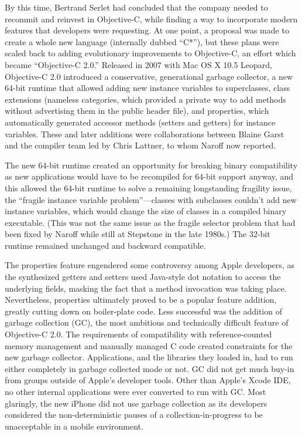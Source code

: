 \documentclass[acmsmall]{acmart}\settopmatter{}
\begin{document}
By this time, Bertrand Serlet had concluded that the company needed to recommit and reinvest in Objective-C, while finding a way to incorporate modern features that developers were requesting. At one point, a proposal was made to create a whole new language (internally dubbed ``C*''), but these plans were scaled back to adding evolutionary improvements to Objective-C, an effort which became ``Objective-C 2.0.'' Released in 2007 with Mac OS X 10.5 Leopard, Objective-C 2.0 introduced a conservative, generational garbage collector, a new 64-bit runtime that allowed adding new instance variables to superclasses, class extensions (nameless categories, which provided a private way to add methods without advertising them in the public header file), and properties, which automatically generated accessor methods (setters and getters) for instance variables. These and later additions were collaborations between Blaine Garst and the compiler team led by Chris Lattner, to whom Naroff now reported.

The new 64-bit runtime created an opportunity for breaking binary compatibility as new applications would have to be recompiled for 64-bit support anyway, and this allowed the 64-bit runtime to solve a remaining longstanding fragility issue, the ``fragile instance variable problem''---classes with subclasses couldn't add new instance variables, which would change the size of classes in a compiled binary executable. (This was not the same issue as the fragile selector problem that had been fixed by Naroff while still at Stepstone in the late 1980s.) The 32-bit runtime remained unchanged and backward compatible.

The properties feature engendered some controversy among Apple developers, as the synthesized getters and setters used Java-style dot notation to access the underlying fields, masking the fact that a method invocation was taking place. Nevertheless, properties ultimately proved to be a popular feature addition, greatly cutting down on boiler-plate code. Less successful was the addition of garbage collection (GC), the most ambitious and technically difficult feature of Objective-C 2.0. The requirements of compatibility with reference-counted memory management and manually managed C code created constraints for the new garbage collector. Applications, and the libraries they loaded in, had to run either completely in garbage collected mode or not. GC did not get much buy-in from groups outside of Apple's developer tools. Other than Apple's Xcode IDE, no other internal applications were ever converted to run with GC. Most glaringly, the new iPhone did not use garbage collection as its developers considered the non-deterministic pauses of a collection-in-progress to be unacceptable in a mobile environment.
\end{document}
